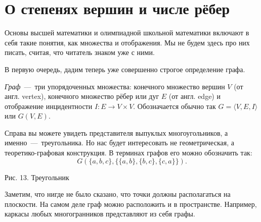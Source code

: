 \newpage
\section{О степенях вершин и числе рёбер}

	Основы высшей математики и олимпиадной школьной математики включают в себя такие понятия, как множества и отображения. Мы не будем здесь про них писать, считая, что читатель знаком уже с ними.
	
	
	В первую очередь, дадим теперь уже совершенно строгое определение графа.

\begin{definition}
	\emph{Граф}~---~три упорядоченных множества: конечного множество вершин $V$ (от англ. vertex), конечного множество рёбер или дуг $E$ (от англ. edge) и отображение инцидентности $I: E \to V \times V$. Обозначается обычно так $G = \langle V, E, I\rangle$ или $G(V, E)$.
\end{definition}

\begin{paracol}{2}
\begin{example}
	Справа вы можете увидеть представителя выпуклых многоугольников, а именно~---~треугольника. Но нас будет интересовать не геометрическая, а теоретико-графовая конструкция. В терминах графов его можно обозначить так:
	$$G(\lbrace a, b, c\rbrace, \lbrace \lbrace a, b\rbrace, \lbrace b, c\rbrace, \lbrace c, a\rbrace \rbrace).$$
\end{example}

\switchcolumn

\begin{center}

	\small Рис. 13. Треугольник
\end{center}

\end{paracol}

	Заметим, что нигде не было сказано, что точки должны располагаться на плоскости. На самом деле граф можно расположить и в пространстве. Например, каркасы любых многогранников представляют из себя графы.

